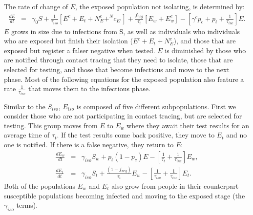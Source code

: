\documentclass[notitlepage, superscriptaddress]{revtex4-2}
\begin{document}
The rate of change of $E$, the exposed population not isolating, is determined by:
\begin{eqnarray}
\label{E:dE}
\frac{dE}{dt} &=& \gamma_{0}S  + \frac{1}{\tau_{iso}}[E^{c} + E_{t} + N^{c}_{E} + ^N{c}_{E'}] + \frac{f_{neg}}{\tau_{t}}[E_{w} + E^{c}_{w}] -  [\gamma^{c} p_{c} +p_{t} + \frac{1}{\tau_{inc}}] E.
\end{eqnarray}
$E$ grows in size due to infections from S, as well as individuals who individuals who are exposed but finish their isolation ($E^{c} + E_{t} + N^{c}_{E}$), and those that are exposed but register a falser negative when tested. $E$ is diminished by those who are notified through contact tracing that they need to isolate, those that are selected for testing, and those that become infectious and move to the next phase. Most of the following equations for the exposed population also feature a rate $\frac{1}{\tau_{inc}}$ that moves them to the infectious phase.

Similar to the $S_{iso}$, $E_{iso}$ is composed of five different subpopulations. First we consider those who are not participating in contact tracing, but are selected for testing. This group moves from $E$ to $E_{w}$ where they await their test results for an average time of $\tau_{t}$. If the test results come back positive, they move to $E_{t}$ and no one is notified. If there is a false negative, they return to $E$:
\begin{eqnarray}
\label{E:dE_w}
\frac{dE_{w}}{dt} &=& \gamma_{iso} S_{w} + p_{t} (1 - p_{c}) E - [\frac{1}{\tau_{t}}  + \frac{1}{\tau_{inc}}] E_{w}, \\
%
\frac{dE_{t}}{dt} &=& \gamma_{iso} S_{t} + \frac{(1- f_{neg})}{\tau_{t}} E_{w} - [\frac{1}{\tau_{iso}}  + \frac{1}{\tau_{inc}}] E_{t}.
\end{eqnarray}
Both of the populations $E_{w}$ and $E_{t}$ also grow from people in their counterpart susceptible populations becoming infected and moving to the exposed stage (the $\gamma_{iso}$ terms). 
\end{document}
